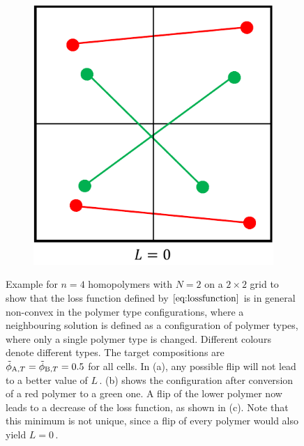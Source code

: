 \documentclass[bachelor,       %
               twoside,        %
               BCOR10mm,       %
               ngerman, english %
               ]{GAUBM}
\begin{document}
\begin{figure}[h]
\begin{subfigure}[b]{0.3\textwidth}
      \caption{}
      \label{fig:loss-2}
  \end{subfigure}
      \hfill
  \begin{subfigure}[b]{0.3\textwidth}
      \centering
      \includegraphics[width=\textwidth]{figures/loss-3.pdf}
      \caption{}
      \label{fig:loss-3}
  \end{subfigure}
     \caption{Example for $n=4$ homopolymers with $N=2$ on a $2\times 2$ grid to show that the loss function defined by $\eqref{eq:lossfunction}$ is in general non-convex in the polymer type configurations, where a neighbouring solution is defined as a configuration of polymer types, where only a single polymer type is changed. Different colours denote different types. The target compositions are $\tilde\phi_{\text A,T}=\tilde\phi_{\text B,T}=0.5$ for all cells. In (a), any possible flip will not lead to a better value of $L\,.$ (b) shows the configuration after conversion of a red polymer to a green one. A flip of the lower polymer now leads to a decrease of the loss function, as shown in (c). Note that this minimum is not unique, since a flip of every polymer would also yield $L=0\,.$}
     \label{fig:loss}
\end{figure}

 


\end{document}

